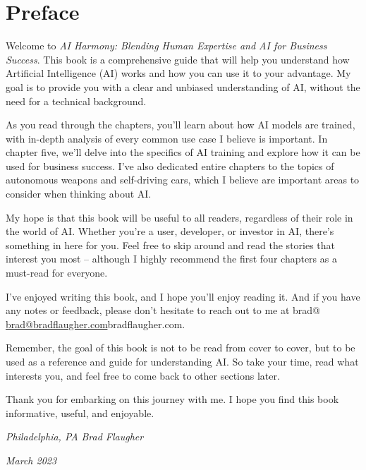 \let\cleardoublepage\clearpage
\chapter*{Preface}

Welcome to \textit{AI Harmony: Blending Human Expertise and AI for Business Success}. This book is a comprehensive guide that will help you understand how Artificial Intelligence (AI) works and how you can use it to your advantage. My goal is to provide you with a clear and unbiased understanding of AI, without the need for a technical background.

As you read through the chapters, you’ll learn about how AI models are trained, with in-depth analysis of every common use case I believe is important. In chapter five, we’ll delve into the specifics of AI training and explore how it can be used for business success. I’ve also dedicated entire chapters to the topics of autonomous weapons and self-driving cars, which I believe are important areas to consider when thinking about AI.

My hope is that this book will be useful to all readers, regardless of their role in the world of AI. Whether you’re a user, developer, or investor in AI, there’s something in here for you. Feel free to skip around and read the stories that interest you most – although I highly recommend the first four chapters as a must-read for everyone.

I’ve enjoyed writing this book, and I hope you’ll enjoy reading it. And if you have any notes or feedback, please don’t hesitate to reach out to me at brad@ \href{mailto:brad@bradflaugher.com}{brad@bradflaugher.com}bradflaugher.com.

Remember, the goal of this book is not to be read from cover to cover, but to be used as a reference and guide for understanding AI. So take your time, read what interests you, and feel free to come back to other sections later.

Thank you for embarking on this journey with me. I hope you find this book informative, useful, and enjoyable.

\textit{Philadelphia, PA} \hfill \textit{Brad Flaugher}

\textit{March 2023}


